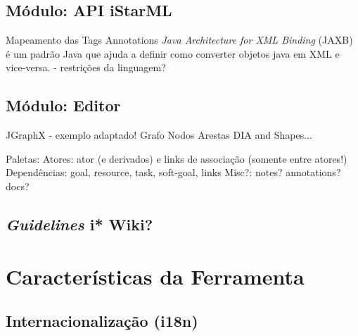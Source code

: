         \subsection{Módulo: API iStarML}
            Mapeamento das Tags
                Annotations
                \emph{Java Architecture for XML Binding} (JAXB) é um padrão Java que ajuda a definir como converter objetos java em XML e vice-versa.
            - restrições da linguagem?

        \subsection{Módulo: Editor}
            JGraphX - exemplo adaptado! %
            Grafo
                Nodos
                Arestas
            DIA and Shapes...

            Paletas:
                Atores: ator (e derivados) e links de associação (somente entre atores!)
                Dependências: goal, resource, task, soft-goal, links
                Misc?: notes? annotations? docs?

        
        \subsection{\emph{Guidelines} i* Wiki?}
    
    \section{Características da Ferramenta}

        \subsection{Internacionalização (i18n)}
